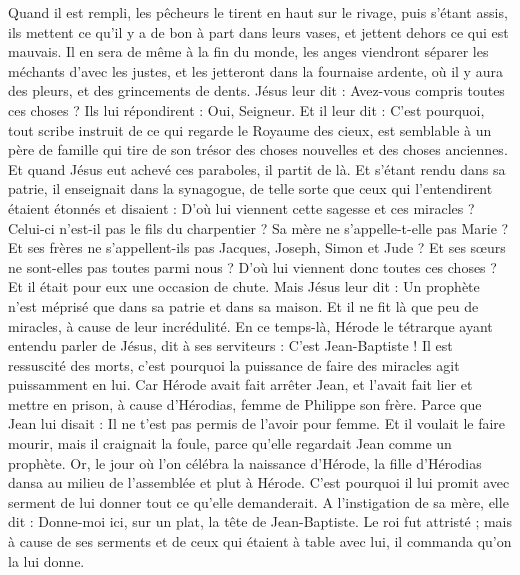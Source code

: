 \begin{multicols}{2}
Quand il est rempli, les pêcheurs le tirent en haut sur le rivage, puis s'étant assis, ils mettent ce qu'il y a de bon à part dans leurs vases, et jettent dehors ce qui est mauvais.
Il en sera de même à la fin du monde, les anges viendront séparer les méchants d'avec les justes,
et les jetteront dans la fournaise ardente, où il y aura des pleurs, et des grincements de dents.
Jésus leur dit : Avez-vous compris toutes ces choses ? Ils lui répondirent : Oui, Seigneur.
Et il leur dit : C’est pourquoi, tout scribe instruit de ce qui regarde le Royaume des cieux, est semblable à un père de famille qui tire de son trésor des choses nouvelles et des choses anciennes.
Et quand Jésus eut achevé ces paraboles, il partit de là.
Et s’étant rendu dans sa patrie, il enseignait dans la synagogue, de telle sorte que ceux qui l’entendirent étaient étonnés et disaient : D’où lui viennent cette sagesse et ces miracles ?
Celui-ci n'est-il pas le fils du charpentier ? Sa mère ne s'appelle-t-elle pas Marie ? Et ses frères ne s'appellent-ils pas Jacques, Joseph, Simon et Jude ?
Et ses sœurs ne sont-elles pas toutes parmi nous ? D'où lui viennent donc toutes ces choses ?
Et il était pour eux une occasion de chute. Mais Jésus leur dit : Un prophète n'est méprisé que dans sa patrie et dans sa maison.
Et il ne fit là que peu de miracles, à cause de leur incrédulité.
\VerseOne{}En ce temps-là, Hérode le tétrarque ayant entendu parler de Jésus, dit à ses serviteurs : C’est Jean-Baptiste !
Il est ressuscité des morts, c'est pourquoi la puissance de faire des miracles agit puissamment en lui.
Car Hérode avait fait arrêter Jean, et l'avait fait lier et mettre en prison, à cause d'Hérodias, femme de Philippe son frère.
Parce que Jean lui disait : Il ne t'est pas permis de l'avoir pour femme.
Et il voulait le faire mourir, mais il craignait la foule, parce qu’elle regardait Jean comme un prophète.
Or, le jour où l’on célébra la naissance d'Hérode, la fille d'Hérodias dansa au milieu de l’assemblée et plut à Hérode.
C'est pourquoi il lui promit avec serment de lui donner tout ce qu'elle demanderait.
A l’instigation de sa mère, elle dit : Donne-moi ici, sur un plat, la tête de Jean-Baptiste.
Le roi fut attristé ; mais à cause de ses serments et de ceux qui étaient à table avec lui, il commanda qu'on la lui donne.

\end{multicols}
